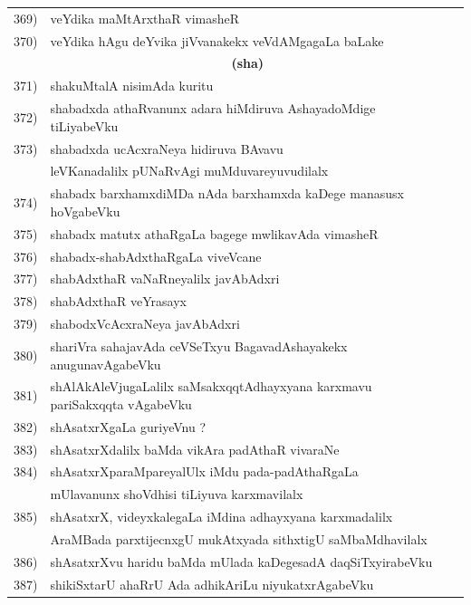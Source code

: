 {\begin{longtable}{@{}cp{7.4cm}r}
 369) & veYdika maMtArxthaR vimasheR & \pageref{page111}\\
 370) & veYdika hAgu deYvika jiVvanakekx veVdAMgagaLa baLake & \pageref{page191}\\[0.3cm]
      & \multicolumn{1}{c}{\textbf{(sha)}} & \\[0.3cm]
 371) &  shakuMtalA nisimAda kuritu & \pageref{page234}\\
 372) & shabadxda athaRvanunx adara hiMdiruva AshayadoMdige tiLiyabeVku & \pageref{page179}\\
 373) & shabadxda ucAcxraNeya hidiruva BAvavu & \\
      & leVKanadalilx pUNaRvAgi muMduvareyuvudilalx & \pageref{page181}\\
 374) &  shabadx barxhamxdiMDa nAda barxhamxda kaDege manasusx hoVgabeVku & \pageref{page161}\\
 375) & shabadx matutx athaRgaLa bagege mwlikavAda vimasheR & \pageref{page111}\\
 376) & shabadx-shabAdxthaRgaLa viveVcane  & \pageref{page113}\\
 377) & shabAdxthaR vaNaRneyalilx javAbAdxri  & \pageref{page112}\\
 378) & shabAdxthaR veYrasayx & \pageref{page112}\\
 379) & shabodxVcAcxraNeya javAbAdxri & \pageref{page124}\\
 380) & shariVra sahajavAda ceVSeTxyu BagavadAshayakekx anugunavAgabeVku & \pageref{page80}\\
 381) & shAlAkAleVjugaLalilx saMsakxqqtAdhayxyana karxmavu pariSakxqqta vAgabeVku &\pageref{page53}\\
 382) & shAsatxrXgaLa guriyeVnu ? & \pageref{page93}\\
 383) & shAsatxrXdalilx baMda vikAra padAthaR vivaraNe & \pageref{page225}\\
 384) & shAsatxrXparaMpareyalUlx iMdu pada-padAthaRgaLa &  \\
      & mUlavanunx shoVdhisi tiLiyuva karxmavilalx & \pageref{page216}\\
 385) & shAsatxrX, videyxkalegaLa iMdina adhayxyana karxmadalilx & \\
      & AraMBada parxtijecnxgU mukAtxyada sithxtigU saMbaMdhavilalx & \pageref{page40}\\
 386) & shAsatxrXvu haridu baMda mUlada kaDegesadA daqSiTxyirabeVku & \pageref{page142}\\
 387) & shikiSxtarU ahaRrU Ada adhikAriLu niyukatxrAgabeVku  & \pageref{page47}\\

\end{longtable}}
